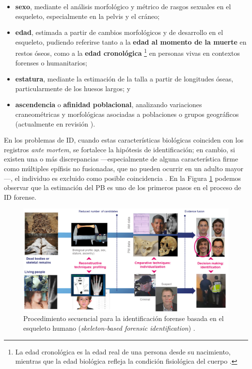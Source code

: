 \begin{itemize}

    \item \textbf{sexo}, mediante el análisis morfológico y métrico de rasgos sexuales en el esqueleto, 
    especialmente en la pelvis y el cráneo;
    
    \item \textbf{edad}, estimada a partir de cambios morfológicos y de desarrollo en el esqueleto, pudiendo 
    referirse tanto a la \textbf{edad al momento de la muerte} en restos óseos, como a la \textbf{edad 
    cronológica}
    \footnote{
        La edad cronológica es la edad real de una persona desde su nacimiento, mientras que la edad biológica 
        refleja la condición fisiológica del cuerpo \cite{marcante2025}.
    }
    en personas vivas en contextos forenses o humanitarios;
    
    \item \textbf{estatura}, mediante la estimación de la talla a partir de longitudes óseas, particularmente 
    de los huesos largos; y
    
    \item \textbf{ascendencia} o \textbf{afinidad poblacional}, analizando variaciones craneométricas y 
    morfológicas asociadas a poblaciones o grupos geográficos (actualmente en revisión \cite{ross2021a, 
    ross2021b, flouri2022}).

\end{itemize}

En los problemas de ID, cuando estas características biológicas coinciden con los registros \textit{ante 
mortem}, se fortalece la hipótesis de identificación; en cambio, si existen una o más discrepancias 
---especialmente de alguna característica firme como múltiples epífisis no fusionadas, que no pueden ocurrir 
en un adulto mayor---, el individuo es excluido como posible coincidencia \cite{byers2023}. 
En la Figura \ref{fig:SFI_pipeline} podemos observar que la estimación del PB es uno de los primeros pasos en 
el proceso de ID forense. 

\begin{figure}[h]
    \centering
    \includegraphics[width=\textwidth]{capitulos/cap_01/imagenes/SFI_pipeline.png}
    \caption{Procedimiento secuencial para la identificación forense basada en el esqueleto humano 
            (\textit{skeleton-based forensic identification}) \cite{mesejo2020}.} 
    \label{fig:SFI_pipeline}
\end{figure}

